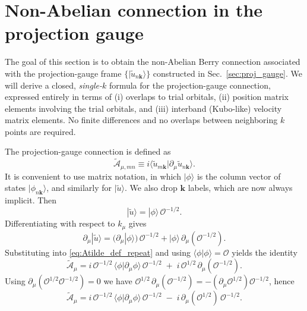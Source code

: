 \documentclass[galley,aps,pra,10pt,amsmath,amssymb,
    superscriptaddress,nofootinbib,longbibliography]{revtex4-2}
\begin{document}
\section{Non-Abelian connection in the projection gauge}
\label{sec:conn}

The goal of this section is to obtain the non-Abelian Berry connection associated with the projection-gauge frame
$\{|\tilde{u}_{n\mathbf{k}}\rangle\}$ constructed in Sec.~\ref{sec:proj_gauge}. We will derive a closed, \emph{single-$k$} formula for the projection-gauge connection, expressed entirely in terms of
(i) overlaps to trial orbitals, (ii) position matrix elements involving the trial orbitals, and
(iii) interband (Kubo-like) velocity matrix elements.
No finite differences and no overlaps between neighboring $k$ points are required.

The projection-gauge connection is defined as
\begin{equation}
\label{eq:Atilde_def_repeat}
\tilde{\mathcal{A}}_{\mu,mn}
\equiv
i\langle \tilde{u}_{m\mathbf{k}}|\partial_{\mu}\tilde{u}_{n\mathbf{k}}\rangle .
\end{equation}
It is convenient to use matrix notation, in which $|\phi\rangle$ is the column vector of states $|\phi_{n\mathbf{k}}\rangle$,
and similarly for $|\tilde{u}\rangle$. We also drop $\mathbf{k}$ labels, which are now always implicit.
Then
\begin{equation}
\label{eq:tildepsi_matrix}
|\tilde{u}\rangle = |\phi\rangle\,\mathcal{O}^{-1/2}.
\end{equation}
Differentiating with respect to $k_\mu$ gives
\begin{equation}
\label{eq:dtildepsi_matrix}
\partial_\mu|\tilde{u}\rangle
=
(\partial_\mu|\phi\rangle)\,\mathcal{O}^{-1/2}
+
|\phi\rangle\,\partial_\mu(\mathcal{O}^{-1/2}).
\end{equation}
Substituting into \eqref{eq:Atilde_def_repeat} and using $\langle\phi|\phi\rangle=\mathcal{O}$ yields the identity
\begin{equation}
\label{eq:Atilde_split_repeat}
\tilde{\mathcal{A}}_\mu
=
i\,\mathcal{O}^{-1/2}\,\langle\phi|\partial_\mu\phi\rangle\,\mathcal{O}^{-1/2}
\;+\;
i\,\mathcal{O}^{1/2}\,\partial_\mu(\mathcal{O}^{-1/2}).
\end{equation}
Using $\partial_\mu(\mathcal{O}^{1/2}\mathcal{O}^{-1/2})=0$ we have $\mathcal{O}^{1/2}\,\partial_\mu(\mathcal{O}^{-1/2})=-(\partial_\mu \mathcal{O}^{1/2})\mathcal{O}^{-1/2}$, hence
\begin{equation}
\label{eq:Atilde_key_identity}
\tilde{\mathcal{A}}_\mu
=
i\,\mathcal{O}^{-1/2}\,\langle\phi|\partial_\mu\phi\rangle\,\mathcal{O}^{-1/2}
\;-\;
i\,\partial_\mu(\mathcal{O}^{1/2})\,\mathcal{O}^{-1/2}.
\end{equation}
\end{document}
